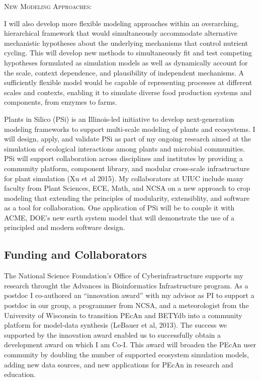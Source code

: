 \documentclass[english]{tufte-handout}
\providecommand\mynewthought[1]{%
   \addvspace{0.5em}%
   \noindent\hspace{-0.5em}\textsc{#1} %
}
\begin{document}
\begin{fullwidth}
\mynewthought{New Modeling Approaches:}
 I will also develop more flexible modeling approaches within an overarching, hierarchical framework that would simultaneously accommodate alternative mechanistic hypotheses about the underlying mechanisms that control nutrient cycling.
 This will develop new methods to simultaneously fit and test competing hypotheses formulated as simulation models as well as dynamically account for the scale, context dependence, and plausibility of independent mechanisms.
 A sufficiently flexible model would be capable of representing processes at different scales and contexts, enabling it to simulate diverse food production systems and components, from enzymes to farms.

 Plants in Silico (PSi) is an Illinois-led initiative to develop next-generation modeling frameworks to support multi-scale modeling of plants and ecosystems.
 I will design, apply, and validate PSi as part of my ongoing research aimed at the simulation of ecological interactions among plants and microbial communities.
 PSi will support collaboration across disciplines and institutes by providing a community platform, component library, and modular cross-scale infrastructure for plant simulation (Xu et al 2015).
 My collaborators at UIUC include many faculty from Plant Sciences, ECE, Math, and NCSA on a new approach to crop modeling that extending the principles of modularity, extensiblity, and software as a tool for collaboration.
 One application of PSi will be to couple it with ACME, DOE's new earth system model that will demonstrate the use of a principled and modern software design.

\subsection{Funding and Collaborators}
   
 The National Science Foundation's Office of Cyberinfrastructure supports my research throught the Advances in Bioinformatics Infrastructure program. 
 As a postdoc I co-authored an ``innovation award'' with my advisor as PI to support a postdoc in our group, a programmer from NCSA, and a meteorologist from the University of Wisconsin to transition PEcAn and BETYdb into a community platform for model-data synthesis (LeBauer et al, 2013).
 The success we supported by the innovation award enabled us to successfully obtain a development award on which I am Co-I.
 This award will broaden the PEcAn user community by doubling the number of supported ecosystem simulation models, adding new data sources, and new applications for PEcAn in research and education.


\end{fullwidth}
\end{document}
